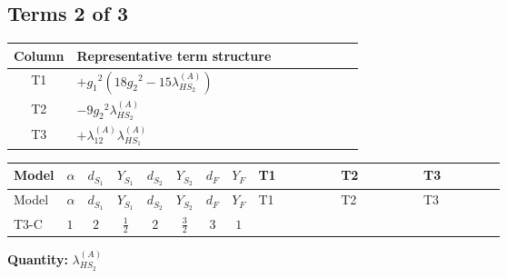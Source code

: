 \documentclass[8pt]{article}
\begin{document}
\begin{landscape}
\subsection*{Terms 2 of 3}
\begin{center}
\begin{tabular}{@{}c >{\raggedright\arraybackslash}p{0.82\linewidth}@{}}
\toprule
Column & Representative term structure \\
\midrule
T1 & \(\displaystyle +{g_1}^2 \left(18 {g_2}^2-15 {\lambda_{HS_2}^{(A)}}\right)\) \\
\midrule
T2 & \(\displaystyle -9 {g_2}^2 {\lambda_{HS_2}^{(A)}}\) \\
\midrule
T3 & \(\displaystyle +{\lambda_{12}^{(A)}} {\lambda_{HS_1}^{(A)}}\) \\
\midrule
\bottomrule
\end{tabular}
\end{center}
\smallskip
\tiny
\begin{longtable}{@{}llcccccc >{\raggedright\arraybackslash}p{0.21\linewidth} >{\raggedright\arraybackslash}p{0.21\linewidth} >{\raggedright\arraybackslash}p{0.21\linewidth}@{}}
\toprule
Model & $\alpha$ & $d_{S_1}$ & $Y_{S_1}$ & $d_{S_2}$ & $Y_{S_2}$ & $d_F$ & $Y_F$ & T1 & T2 & T3 \\
\midrule
\endfirsthead
\toprule
Model & $\alpha$ & $d_{S_1}$ & $Y_{S_1}$ & $d_{S_2}$ & $Y_{S_2}$ & $d_F$ & $Y_F$ & T1 & T2 & T3 \\
\midrule
\endhead
T3-C & $1$ & $2$ & $\frac{1}{2}$ & $2$ & $\frac{3}{2}$ & $3$ & $1$ & \scriptsize\adjustbox{max width=\linewidth}{$\begin{gathered} +{g_1}^2 \left(18 {g_2}^2-15 {\lambda_{HS_2}^{(A)}}\right)\end{gathered}$} & \scriptsize\adjustbox{max width=\linewidth}{$\begin{gathered} -9 {g_2}^2 {\lambda_{HS_2}^{(A)}}\end{gathered}$} & \scriptsize\adjustbox{max width=\linewidth}{$\begin{gathered} +{\lambda_{12}^{(A)}} {\lambda_{HS_1}^{(A)}}\end{gathered}$} \\
\midrule
\bottomrule
\end{longtable}
\clearpage
\noindent\textbf{Quantity: }$\lambda_{HS_2}^{(A)}$\par\smallskip

\end{landscape}
\end{document}
